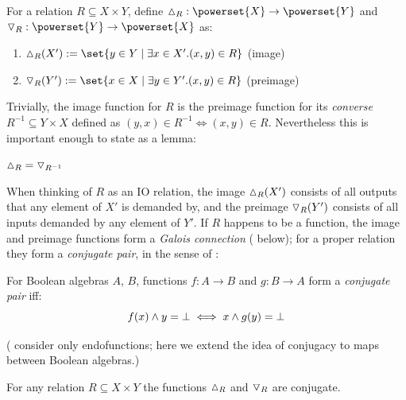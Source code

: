 \begin{definition}
   For a relation $R \subseteq X \times Y$, define $\demandedByR_R: \powerset{X} \to \powerset{Y}$ and
   $\demandsR_R : \powerset{Y} \to \powerset{X}$ as:
   \begin{enumerate}
      \item $\demandedByR_{R}(X') \eqdef \set{y \in Y \mid \exists x \in X'.(x,y) \in R}$ \hfill (image)
      \item $\demandsR_{R}(Y') \eqdef \set{x \in X \mid \exists y \in Y'. (x,y) \in R}$ \hfill (preimage)
   \end{enumerate}
\end{definition}

\noindent Trivially, the image function for $R$ is the preimage function for its \emph{converse} $R^{-1}
\subseteq Y \times X$ defined as $(y,x) \in R^{-1} \iff (x,y) \in R$. Nevertheless this is important enough to
state as a lemma:

\begin{lemma}
\label{lem:conjugate:image-preimage-converse}
$\demandedByR_{R} = \demandsR_{R^{-1}}$
\end{lemma}

When thinking of $R$ as an IO relation, the image $\demandedByR_{R}(X')$ consists of all outputs that any
element of $X'$ is demanded by, and the preimage $\triangledown_{R}(Y')$ consists of all inputs demanded by any
element of $Y'$. If $R$ happens to be a function, the image and preimage functions form a \emph{Galois
connection} ( below); for a proper relation they form a \textit{conjugate
pair}, in the sense of \citet{jonsson51}:

\begin{definition}
   For Boolean algebras $A$, $B$, functions $f: A \to B$ and $g: B \to A$ form a \textit{conjugate pair} iff:
   $$
   f(x) \wedge y = \bot \iff x \wedge g(y) = \bot
   $$
\end{definition}

\noindent (\citeauthor{jonsson51} consider only endofunctions; here we extend the idea of conjugacy to maps
between Boolean algebras.)

\begin{lemma}
\label{lem:im-preim-conjugate}
For any relation $R \subseteq X \times Y$ the functions $\demandedByR_{R}$ and $\triangledown_{R}$ are conjugate.
\end{lemma}

